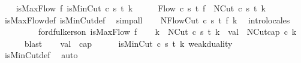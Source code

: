 \begin{isabellebody}
\ \ \isamarkupfalse%
\ {\isachardoublequoteopen}isMaxFlow\ f{\isachardoublequoteclose}\ {\isachardoublequoteopen}isMinCut\ c\ s\ t\ k{\isachardoublequoteclose}\isanewline
\ \ \isamarkupfalse%
\ \isamarkupfalse%
\ Flow\ c\ s\ t\ f\ {\isacharplus}\ NCut\ c\ s\ t\ k\isanewline
\ \ \ \ \isamarkupfalse%
\ isMaxFlow{\isacharunderscore}def\ isMinCut{\isacharunderscore}def\ \isamarkupfalse%
\ simp{\isacharunderscore}all\isanewline
\ \ \isamarkupfalse%
\ NFlowCut\ c\ s\ t\ f\ k\ \isamarkupfalse%
\ intro{\isacharunderscore}locales\ \isanewline
\ \ \isanewline
\ \ \isanewline
\ \ \isamarkupfalse%
\ ford{\isacharunderscore}fulkerson\ {\isacartoucheopen}isMaxFlow\ f{\isacartoucheclose}\isanewline
\ \ \isamarkupfalse%
\ k{\isacharprime}\ \ {\isachardoublequoteopen}NCut\ c\ s\ t\ k{\isacharprime}{\isachardoublequoteclose}\ \ {\isachardoublequoteopen}val\ {\isacharequal}\ NCut{\isachardot}cap\ c\ k{\isacharprime}{\isachardoublequoteclose}\isanewline
\ \ \ \ \isamarkupfalse%
\ blast\isanewline
\ \ \isamarkupfalse%
\ {\isachardoublequoteopen}val\ {\isacharequal}\ cap{\isachardoublequoteclose}\isanewline
\ \ \ \ \isamarkupfalse%
\ {\isacartoucheopen}isMinCut\ c\ s\ t\ k{\isacartoucheclose}\ weak{\isacharunderscore}duality\isanewline
\ \ \ \ \isamarkupfalse%
\ isMinCut{\isacharunderscore}def\ \isamarkupfalse%
\ auto\isanewline
{}\isamarkupfalse%
%
\endisatagproof
{\isafoldproof}%
%
\isadelimproof
\ \ \ \ \isanewline
%
\endisadelimproof
%
\isadelimtheory
\isanewline
%
\endisadelimtheory
%
\isatagtheory
{}\isamarkupfalse%
\ %
%
\endisatagtheory
{\isafoldtheory}%
%
\isadelimtheory
%
\endisadelimtheory
%
\end{isabellebody}%
